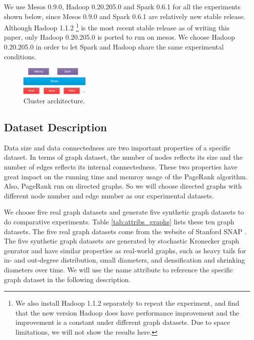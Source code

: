 \documentclass[12pt,conference,letterpaper]{IEEEtran}
\begin{document}
We use Mesos 0.9.0, Hadoop 0.20.205.0 and Spark 0.6.1 for all the experiments shown below, since  Mesos 0.9.0 and Spark 0.6.1 are relatively new stable release. Although Hadoop 1.1.2 \footnote{We also install Hadoop 1.1.2 separately to repeat the experiment, and find that the new version Hadoop does have performance improvement and the improvement is a constant under different graph datasets. Due to space limitations, we will not show the results here.} is the most recent stable release as of writing this paper, only Hadoop 0.20.205.0 is ported to run on mesos. We choose Hadoop 0.20.205.0 in order to let Spark and Hadoop share the same experimental conditions.
\begin{figure}[!t]
\centering
\includegraphics[width=0.3\textwidth]{figures/cluster-architect.eps}
\caption{Cluster architecture.}
\label{fig:cluster-architec}
\end{figure}


\subsection{Dataset Description}
\label{subsec:dataset_des}

Data size and data connectedness are two important properties of a specific dataset. In terms of graph dataset, the number of nodes reflects its size and the number of edges reflects its internal connectedness. These two properties have great impact on the running time and memroy usage of the PageRank algorithm. Also, PageRank run on directed graphs. So we will choose directed graphs with different node number and edge number as our experimental datasets.


We choose five real graph datasets and generate five synthetic graph datasets to do comparative experiments. Table \ref{tab:attribs_graphs} lists these ten graph datasets. The five real graph datasets come from the website of Stanford SNAP \cite{url_snap}. The five synthetic graph datasets are generated by stochastic Kronecker graph \cite{jurij2005} genrator and have similar properties as real-world graphs, such as heavy tails for in- and out-degree distribution, small diameters, and densification and shrinking diameters over time. We will use the name attribute to reference the specific graph dataset in the following description.
\end{document}
